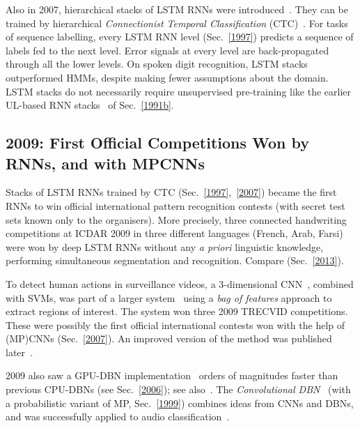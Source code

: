 \documentclass[letterpaper]{article}
\begin{document}
\begin{CJK*}{UTF8}{gbsn}
\begin{sloppypar}
Also in 2007, 
hierarchical stacks of LSTM RNNs were introduced~\citep{Santi:07ijcai}. They can be 
trained by hierarchical {\em Connectionist Temporal Classification} (CTC)~\citep{Graves:06icml}. 
For tasks of sequence labelling, 
every LSTM RNN level (Sec.~\ref{1997}) predicts a sequence of labels fed to the next level. 
Error signals at every level are back-propagated through all the
lower levels. On spoken digit recognition, LSTM stacks
outperformed HMMs, despite making fewer assumptions about the domain.
LSTM stacks do not necessarily require unsupervised pre-training
like the earlier UL-based RNN stacks~\citep{chunker91and92} of Sec.~\ref{1991b}.



\subsection{2009: First Official Competitions Won by RNNs, and with MPCNNs}
\label{2009}

Stacks  of LSTM RNNs trained by CTC (Sec.~\ref{1997},~\ref{2007})
 became
the first   RNNs  to win
official international pattern recognition contests (with secret test sets known
only to the organisers). More precisely,
three connected handwriting competitions at ICDAR 2009 in three different languages 
(French, Arab, Farsi) were won by deep
LSTM RNNs without any {\em a priori} linguistic knowledge,
performing simultaneous segmentation and recognition.
Compare
\citep{graves05nn,Graves:09tpami,schmidhuber2011agi,graves:2013icassp,graves2014} (Sec.~\ref{2013}).


To detect human actions in surveillance videos,
a 3-dimensional CNN~\citep[e.g.,][]{seung2009,prokhorov2010}, combined with SVMs, was part of a larger 
system~\citep{trecvid2009}
using a {\em bag of features} approach \citep{nowak2006}
to extract regions of interest.
The system won three 2009 TRECVID competitions.
These were possibly the first official international contests won with the help of (MP)CNNs (Sec.~\ref{2007}).
An improved version of the method was published later~\citep{ji2013}.

2009 also saw a GPU-DBN 
implementation~\citep{raina2009large} orders of magnitudes faster than previous CPU-DBNs
(see Sec.~\ref{2006}); see also~\citep{coates:2013icml}.
The {\em Convolutional DBN}~\citep{lee:2009} (with a probabilistic 
variant of MP, Sec.~\ref{1999})
combines ideas from CNNs and DBNs,
and was successfully applied to audio classification~\citep{lee2009audio}.






\end{sloppypar}
\end{CJK*}
\end{document}
